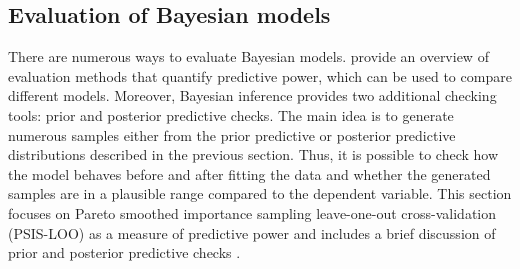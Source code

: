 \subsection{Evaluation of Bayesian models}
\label{ch:bayesian_evaluation}

There are numerous ways to evaluate Bayesian models.
\cite{piironen_comparison_2017} provide an overview of evaluation methods that quantify predictive power, which can be used to compare different models.
Moreover, Bayesian inference provides two additional checking tools: prior and posterior predictive checks.
The main idea is to generate numerous samples either from the prior predictive or posterior predictive distributions described in the previous section.
Thus, it is possible to check how the model behaves before and after fitting the data and whether the generated samples are in a plausible range compared to the dependent variable.
This section focuses on Pareto smoothed importance sampling leave-one-out cross-validation (PSIS-LOO) as a measure of predictive power and includes a brief discussion of prior and posterior predictive checks \citep{vehtari_practical_2017}.

